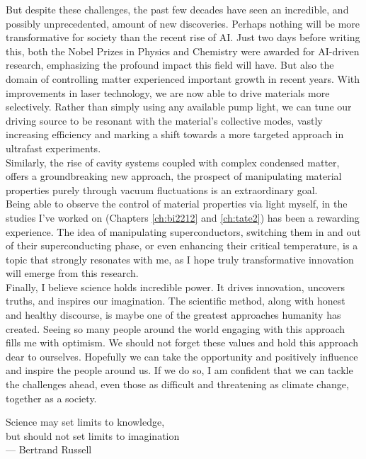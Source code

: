 But despite these challenges, the past few decades have seen an incredible, and possibly unprecedented, amount of new discoveries.
Perhaps nothing will be more transformative for society than the recent rise of AI.
Just two days before writing this, both the Nobel Prizes in Physics and Chemistry were awarded for AI-driven research, emphasizing the profound impact this field will have.
But also the domain of controlling matter experienced important growth in recent years.
With improvements in laser technology, we are now able to drive materials more selectively.
Rather than simply using any available pump light, we can tune our driving source to be resonant with the material’s collective modes, vastly increasing efficiency and marking a shift towards a more targeted approach in ultrafast experiments.\\
Similarly, the rise of cavity systems coupled with complex condensed matter, offers a groundbreaking new approach, the prospect of manipulating material properties purely through vacuum fluctuations is an extraordinary goal.\\
Being able to observe the control of material properties via light myself, in the studies I’ve worked on (Chapters \ref{ch:bi2212} and \ref{ch:tate2}) has been a rewarding experience.
The idea of manipulating superconductors, switching them in and out of their superconducting phase, or even enhancing their critical temperature, is a topic that strongly resonates with me, as I hope truly transformative innovation will emerge from this research.\\

Finally, I believe science holds incredible power.
It drives innovation, uncovers truths, and inspires our imagination.
The scientific method, along with honest and healthy discourse, is maybe one of the greatest approaches humanity has created.
Seeing so many people around the world engaging with this approach fills me with optimism.
We should not forget these values and hold this approach dear to ourselves.
Hopefully we can take the opportunity and positively influence and inspire the people around us.
If we do so, I am confident that we can tackle the challenges ahead, even those as difficult and threatening as climate change, together as a society.


\vspace*{3cm}

\begin{raggedleft}
	Science may set limits to knowledge,\\
	but should not set limits to imagination\\
	--- Bertrand Russell\\
\end{raggedleft}